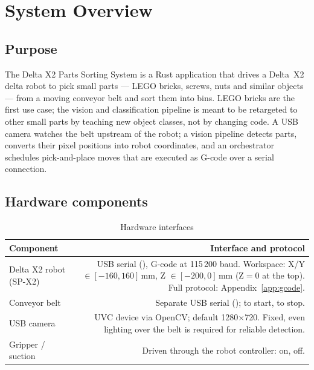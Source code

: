 \chapter{System Overview}

\section{Purpose}
%
The Delta X2 Parts Sorting System is a Rust application that drives a
Delta~X2 delta robot to pick small parts --- LEGO bricks, screws, nuts and
similar objects --- from a moving conveyor belt and sort them into bins.
LEGO bricks are the first use case; the vision and classification pipeline
is meant to be retargeted to other small parts by teaching new object
classes, not by changing code. A USB camera watches the belt upstream of
the robot; a vision pipeline detects parts, converts their pixel positions
into robot coordinates, and an orchestrator schedules pick-and-place moves
that are executed as G-code over a serial connection.

\section{Hardware components}
%
\begin{table}[h]
  \centering
  \begin{tabularx}{\textwidth}{lD}
    \toprule
    \textbf{Component} & \textbf{Interface and protocol} \\
    \midrule
    Delta X2 robot (SP-X2) & USB serial (), G-code at 115\,200 baud.
      Workspace: X/Y $\in [-160, 160]$\,mm, Z $\in [-200, 0]$\,mm (Z$=0$ at the top).
      Full protocol: Appendix~\ref{app:gcode}. \\
    Conveyor belt & Separate USB serial ();  to
      start,  to stop. \\
    USB camera & UVC device via OpenCV; default 1280$\times$720. Fixed, even
      lighting over the belt is required for reliable detection. \\
    Gripper / suction & Driven through the robot controller:  on,
       off. \\
    \bottomrule
  \end{tabularx}
  \caption{Hardware interfaces}
\end{table}

